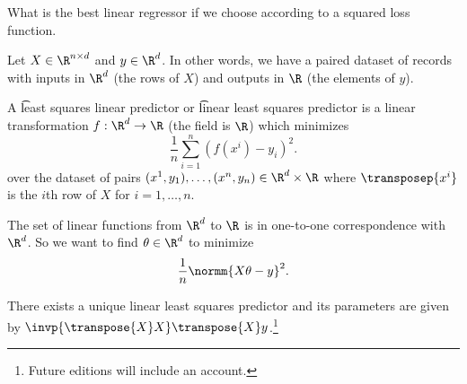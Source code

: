 

What is the best linear regressor if we choose according to a squared loss function.


Let $X \in \R^{n \times d}$ and $y \in \R^d$.
In other words, we have a paired dataset of records with inputs in $\R^d$ (the rows of $X$) and outputs in $\R$ (the elements of $y$).

A \t{least squares linear predictor} or \t{linear least squares predictor} is a linear transformation $f: \R^d \to \R$ (the field is $\R$) which minimizes
\[
  \frac{1}{n} \sum_{i = 1}^{n} (f(x^i) - y_i)^2.
\]
over the dataset of pairs $(x^1, y_1), \dots, (x^n, y_n) \in \R^d \times \R$ where $\transposep{x^i}$ is the $i$th row of $X$ for $i = 1, \dots, n$.

The set of linear functions from $\R^d$ to $\R$ is in one-to-one correspondence with $\R^d$.
So we want to find $\theta \in \R^d$ to  minimize
\[
  \frac{1}{n} \normm{X\theta - y}^2.
\]


\begin{proposition}
  There exists a unique linear least squares predictor and its parameters are given by $\invp{\transpose{X}X}\transpose{X}y$.\footnote{Future editions will include an account.}
\end{proposition}


\blankpage
